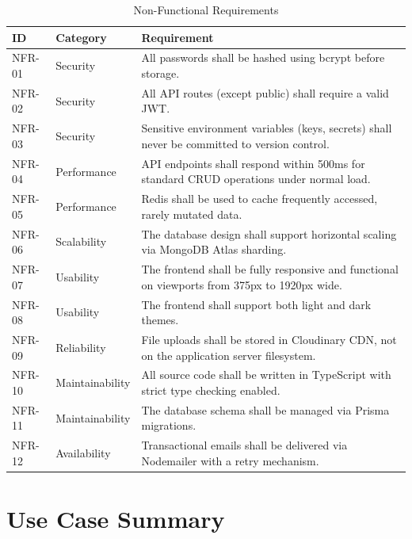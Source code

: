 \begin{table}[H]
\centering
\caption{Non-Functional Requirements}
\begin{tabularx}{\textwidth}{llX}
\toprule
\textbf{ID} & \textbf{Category} & \textbf{Requirement} \\
\midrule
NFR-01 & Security    & All passwords shall be hashed using bcrypt before storage. \\
NFR-02 & Security    & All API routes (except public) shall require a valid JWT. \\
NFR-03 & Security    & Sensitive environment variables (keys, secrets) shall never be committed to version control. \\
NFR-04 & Performance & API endpoints shall respond within 500ms for standard CRUD operations under normal load. \\
NFR-05 & Performance & Redis shall be used to cache frequently accessed, rarely mutated data. \\
NFR-06 & Scalability & The database design shall support horizontal scaling via MongoDB Atlas sharding. \\
NFR-07 & Usability   & The frontend shall be fully responsive and functional on viewports from 375px to 1920px wide. \\
NFR-08 & Usability   & The frontend shall support both light and dark themes. \\
NFR-09 & Reliability & File uploads shall be stored in Cloudinary CDN, not on the application server filesystem. \\
NFR-10 & Maintainability & All source code shall be written in TypeScript with strict type checking enabled. \\
NFR-11 & Maintainability & The database schema shall be managed via Prisma migrations. \\
NFR-12 & Availability & Transactional emails shall be delivered via Nodemailer with a retry mechanism. \\
\bottomrule
\end{tabularx}
\end{table}

\section{Use Case Summary}

